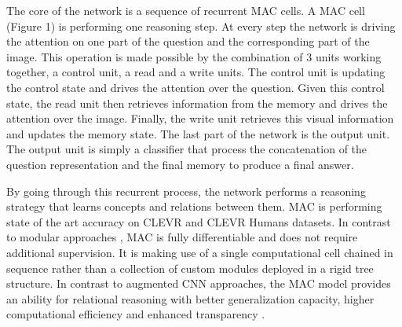 The core of the network is a sequence of recurrent MAC cells. A MAC cell (Figure 1) is performing one reasoning step. At every step the network is driving the attention on one part of the question and the corresponding part of the image. This operation is made possible by the combination of 3 units working together, a control unit, a read and a write units. The control unit is updating the control state and drives the attention over the question. Given this control state, the read unit then retrieves information from the memory and drives the attention over the image.
Finally, the write unit retrieves this visual information and updates the memory state.
The last part of the network is the output unit. The output unit is simply a classifier that process the concatenation of the question representation and the final memory to produce a final answer.

By going through this recurrent process, the network performs a reasoning strategy that learns concepts and relations between them. MAC is performing state of the art accuracy on CLEVR and CLEVR Humans datasets.
In contrast to modular approaches \cite{andreas2016learning,hu2017learning,johnson2017inferring}, MAC is fully
differentiable and does not require additional supervision. It is making use of a single computational cell chained in sequence rather than a collection of custom modules deployed in a rigid tree structure.
In contrast to augmented CNN approaches, the MAC model provides an ability for relational reasoning with better generalization capacity, higher
computational efficiency and enhanced transparency \cite{hudson2018compositional}.

